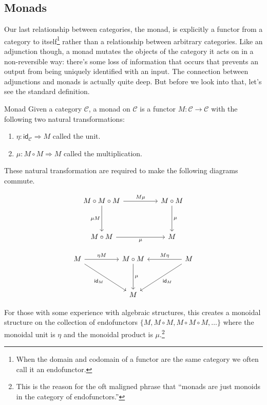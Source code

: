 \documentclass[12pt]{article}
\begin{document}
\subsection*{Monads}
Our last relationship between categories, the monad, is explicitly a functor from a category to itself\footnote{When the domain and codomain of a functor are the same category we often call it an endofunctor.} rather than a relationship between arbitrary categories.
Like an adjunction though, a monad mutates the objects of the category it acts on in a non-reversible way: there's some loss of information that occurs that prevents an output from being uniquely identified with an input.
The connection between adjunctions and monads is actually quite deep.
But before we look into that, let's see the standard definition.
\begin{definition}{Monad}{}
    Given a category $\mathcal{C}$, a monad on $\mathcal{C}$ is a functor $M:\mathcal{C}\rightarrow\mathcal{C}$ with the following two natural transformations:
    \begin{enumerate}
        \item $\eta : \mathsf{id}_{\mathcal{C}} \Rightarrow M$ called the unit.
        \item $\mu: M\circ M \Rightarrow M$ called the multiplication.
    \end{enumerate}
    These natural transformation are required to make the following diagrams commute.

    \[\begin{tikzcd}
            M\circ M\circ M && M\circ M \\
            \\
            M\circ M && M
            \arrow["M\mu", from=1-1, to=1-3]
            \arrow["\mu", from=1-3, to=3-3]
            \arrow["\mu"', from=3-1, to=3-3]
            \arrow["{\mu M}"', from=1-1, to=3-1]
        \end{tikzcd}\]

    \[\begin{tikzcd}
            M && M\circ M && M \\
            \\
            && M
            \arrow["{\eta M}", from=1-1, to=1-3]
            \arrow["M\eta"', from=1-5, to=1-3]
            \arrow["\mu", from=1-3, to=3-3]
            \arrow["{\mathsf{id}_M}", from=1-5, to=3-3]
            \arrow["{\mathsf{id}_M}"', from=1-1, to=3-3]
        \end{tikzcd}\]

    For those with some experience with algebraic structures, this creates a monoidal structure on the collection of endofunctors $\{M, M\circ M, M\circ M\circ M,\dots\}$ where the monoidal unit is $\eta$ and the monoidal product is $\mu$.\footnote{This is the reason for the oft maligned phrase that ``monads are just monoids in the category of endofunctors.''}
\end{definition}
\end{document}
